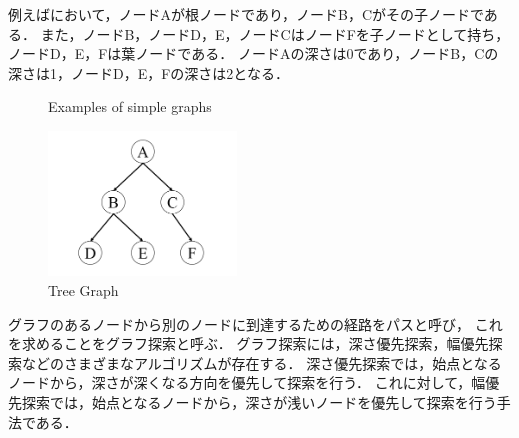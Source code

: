 例えばにおいて，ノードAが根ノードであり，ノードB，Cがその子ノードである．
また，ノードB，ノードD，E，ノードCはノードFを子ノードとして持ち，ノードD，E，Fは葉ノードである．
ノードAの深さは0であり，ノードB，Cの深さは1，ノードD，E，Fの深さは2となる．

\begin{figure}[h]
  \hspace{0.04\columnwidth}
  \caption{Examples of simple graphs}
  \label{fig:example_simple_graphs}
\end{figure}

\begin{figure}[h]
  \begin{center}
    \includegraphics[width=50mm, clip]{figure/chapter2/tree_graph.png}
    \caption{Tree Graph}
    \label{fig:tree_graph} %
  \end{center}
\end{figure}

グラフのあるノードから別のノードに到達するための経路をパスと呼び，
これを求めることをグラフ探索と呼ぶ．
グラフ探索には，深さ優先探索，幅優先探索などのさまざまなアルゴリズムが存在する．
深さ優先探索では，始点となるノードから，深さが深くなる方向を優先して探索を行う．
これに対して，幅優先探索では，始点となるノードから，深さが浅いノードを優先して探索を行う手法である．

